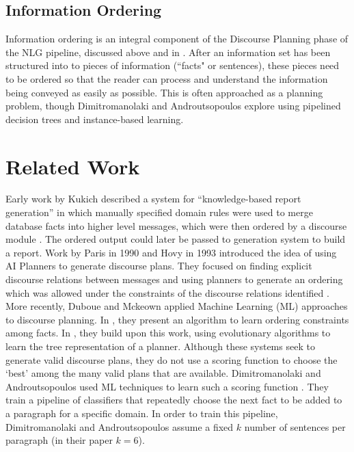 \documentclass[12pt]{article}
\begin{document}
\subsection{Information Ordering}

Information ordering is an integral component of the Discourse Planning phase
of the NLG pipeline, discussed above and in \cite{applied_nlg}. After an
information set has been structured into to pieces of information (``facts" or
sentences), these pieces need to be ordered so that the reader can process and
understand the information being conveyed as easily as possible. This is often
approached as a planning problem, though Dimitromanolaki and
Androutsopoulos\cite{learning_to_order_facts} explore using pipelined decision
trees and instance-based learning.

\section{Related Work}

Early work by Kukich described a system for ``knowledge-based report generation'' in which manually specified domain rules were used to merge database facts into higher level messages, which were then ordered by a discourse module \cite{kukich1983knowledge}. The ordered output could later be passed to generation system to build a report. Work by Paris in 1990 and Hovy in 1993 introduced the idea of using AI Planners to generate discourse plans. They focused on finding explicit discourse relations between messages and using planners to generate an ordering which was allowed under the constraints of the discourse relations identified \cite{paris1990natural}\cite{hovy1993automated}. More recently, Duboue and Mckeown applied Machine Learning (ML) approaches to discourse planning. In \cite{duboue2001empirically}, they present an algorithm to learn ordering constraints among facts. In \cite{duboue2002content}, they build upon this work, using evolutionary algorithms to learn the tree representation of a planner. Although these systems seek to generate valid discourse plans, they do not use a scoring function to choose the `best' among the many valid plans that are available. Dimitromanolaki and Androutsopoulos used ML techniques to learn such a scoring function \cite{learning_to_order_facts}. They train a pipeline of classifiers that repeatedly choose the next fact to be added to a paragraph for a specific domain.
In order to train this pipeline, Dimitromanolaki and Androutsopoulos assume a
fixed $k$ number of sentences per paragraph (in their paper $k=6$).
\end{document}
